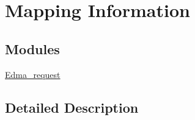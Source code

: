 \hypertarget{group___mapping___information}{}\section{Mapping Information}
\label{group___mapping___information}
\subsection*{Modules}
\begin{DoxyCompactItemize}
\item 
\mbox{\hyperlink{group__edma__request}{Edma\+\_\+request}}
\end{DoxyCompactItemize}


\subsection{Detailed Description}
